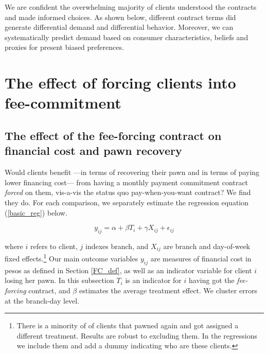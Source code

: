 \documentclass[oneside,11pt]{article}
\begin{document}
We are confident the overwhelming majority of clients understood the contracts and made informed choices. As shown below, different contract terms did generate differential demand and differential behavior. Moreover, we can systematically predict demand based on consumer characteristics, beliefs and proxies for present biased preferences.



\section{The effect of forcing clients into fee-commitment} \label{fee-commitment}



\subsection{The effect of the fee-forcing contract on financial cost and pawn recovery} \label{TE_fee-forcing}

Would clients benefit ---in terms of recovering their pawn and in terms of paying lower financing cost--- from having a monthly payment commitment contract \textit{forced} on them, vis-a-vis the status quo pay-when-you-want contract? We find they do. For each comparison, we separately estimate the regression equation (\ref{basic_reg}) below.

\begin{equation} \label{basic_reg}
    y_{ij} = \alpha + \beta T_{i} + \gamma X_{ij} + \epsilon_{ij}
\end{equation}

\noindent where $i$ refers to client, $j$ indexes branch, and $X_{ij}$ are branch and day-of-week fixed effects.\footnote{There is a minority of of clients that pawned again and got assigned a different treatment. Results are robust to excluding them. In the regressions we include them and add a dummy indicating who are these clients.} %
Our main outcome variables $y_{ij}$ are measures of financial cost in pesos as defined in Section \ref{FC_def}, as well as an indicator variable for client $i$ losing her pawn. In this subsection $T_{i}$ is an indicator for $i$ having got the \textit{fee-forcing} contract, and $\beta$ estimates the average treatment effect. We cluster errors at the branch-day level.%
\end{document}
